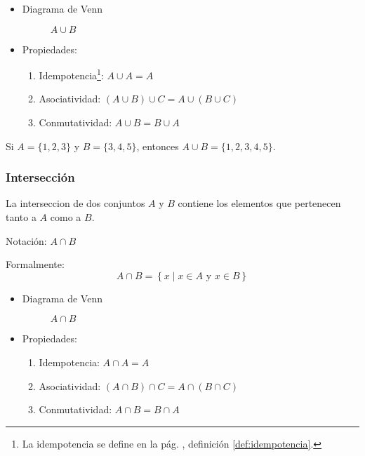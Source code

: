 \begin{itemize}
	\item Diagrama de Venn
	\begin{figure}[H]
		\centering
		\begin{venndiagram2sets}
			\fillA \fillB
		\end{venndiagram2sets}
		\caption*{$A \cup B$}
	\end{figure}
	
	\item Propiedades:
	\begin{enumerate}[label=\roman*)]
		\item Idempotencia\footnote{La idempotencia se define en la pág.  \pageref{def:idempotencia}, definición \ref{def:idempotencia}.}: \( A \cup A = A \)
		\item Asociatividad: \( \left( A \cup B \right) \cup C = A \cup \left( B \cup C \right) \)
		\item Conmutatividad: \( A \cup B = B \cup A\)
	\end{enumerate}
\end{itemize}

\begin{example}[Unión]
	Si \(A = \{1, 2, 3\}\) y \(B = \{3, 4, 5\}\), entonces \(A \cup B = \{1, 2, 3, 4, 5\}\).
\end{example}

\subsubsection{Intersección }
\vspace{1em} 
\begin{fmd-definition}[Intersección]
	La \gls{interseccion} de dos conjuntos \(A\) y \(B\) contiene los elementos que pertenecen tanto a \(A\) como a \(B\).
	
	Notación: \(A \cap B\)
	
	Formalmente:
	\[ A \cap B = \left\{ x \mid x \in A \mbox{ y } x \in B \right\} \]
\end{fmd-definition}

\begin{itemize}
	\item Diagrama de Venn
	\begin{figure}[H]
		\centering
		\begin{venndiagram2sets}
			\fillACapB
		\end{venndiagram2sets}
		\caption*{\(A \cap B \)}
	\end{figure}
	
	\item Propiedades:
	\begin{enumerate}[label=\roman*)]
		\item Idempotencia: \( A \cap A = A \) 
		\item Asociatividad: \( \left( A \cap B \right) \cap C = A \cap \left( B \cap C \right) \) 
		\item Conmutatividad: \( A \cap B = B \cap A\) 
	\end{enumerate}
\end{itemize}

